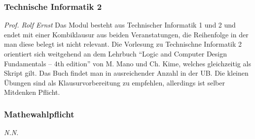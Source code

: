 \begin{multicols}{2}
\subsubsection{Technische Informatik 2}
	\textit{Prof. Rolf Ernst}
	Das Modul besteht aus Technischer Informatik 1 und 2 und endet mit einer Kombiklausur aus beiden Veranstatungen, die Reihenfolge in der man diese belegt ist nicht relevant. 
	Die Vorlesung zu Technischne Informatik 2 orientiert sich weitgehend an dem Lehrbuch \enquote{Logic and Computer Design Fundamentals – 4th edition} von M. Mano und Ch. Kime, welches gleichzeitig als Skript gilt. Das Buch findet man in ausreichender Anzahl in der UB. Die kleinen Übungen sind als Klausurvorbereitung zu empfehlen, allerdings ist selber Mitdenken Pflicht.

\subsubsection{Mathewahlpflicht}
	\textit{N.N.}


\end{multicols}
